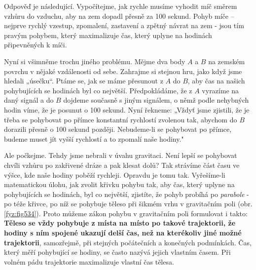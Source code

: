     Odpověď je následující. Vypočítejme, jak rychle musíme vyhodit míč směrem vzhůru do vzduchu, 
    aby na zem dopadl přesně za \num{100} sekund. Pohyb míče – nejprve rychlý vzestup, zpomalení, 
    zastavení a zpětný návrat na zem - jsou tím pravým pohybem, který maximalizuje čas, který 
    uplyne na hodinách připevněných k míči.
    
    Nyní si všimněme trochu jiného problému. Mějme dva body \(A\) a \(B\) na zemském povrchu v 
    nějaké vzdálenosti od sebe. Zahrajme si stejnou hru, jako když jsme hledali „úsečku“. Ptáme se, 
    jak se máme přesunout z \(A\) do \(B\), aby čas na našich pohybujících se hodinách byl co 
    největší. Předpokládáme, že z \(A\) vyrazíme na daný signál a do \(B\) dojdeme současně s jiným 
    signálem, o němž podle nehybných hodin víme, že je posunut o \num{100} sekund. Nyní řekneme: 
    „Vždyť jsme zjistili, že je třeba se pohybovat po přímce konstantní rychlostí zvolenou tak, 
    abychom do \(B\) dorazili přesně o \num{100} sekund později. Nebudeme-li se pohybovat po 
    přímce, budeme muset jít vyšší rychlostí a to zpomalí naše hodiny."
    
    Ale počkejme. Tehdy jsme nebrali v úvahu gravitaci. Není lepší se pohybovat chvíli vzhůru po 
    zakřivené dráze a pak klesat dolů? Tak strávíme část času ve výšce, kde naše hodiny poběží 
    rychleji. Opravdu je tomu tak. Vyřešíme-li matematickou úlohu, jak zvolit křivku pohybu tak, 
    aby čas, který uplyne na pohybujících se hodinách, byl co největší, zjistíte, že pohyb probíhá 
    po \emph{parabole} - po téže křivce, po níž se pohybuje těleso při šikmém vrhu v gravitačním 
    poli (obr. \ref{fyz:fig534}). Proto můžeme zákon pohybu v gravitačním poli formulovat i takto: 
    \textbf{Těleso se vždy pohybuje z místa na místo po takové trajektorii, že hodiny s ním spojené 
    ukazují delší čas, než na kterékoliv jiné možné trajektorii}, samozřejmě, při stejných 
    počátečních a konečných podmínkách. Čas, který měří pohybující se hodiny, se často nazývá 
    jejich vlastním časem. Při volném pádu trajektorie maximalizuje vlastní čas tělesa. 

